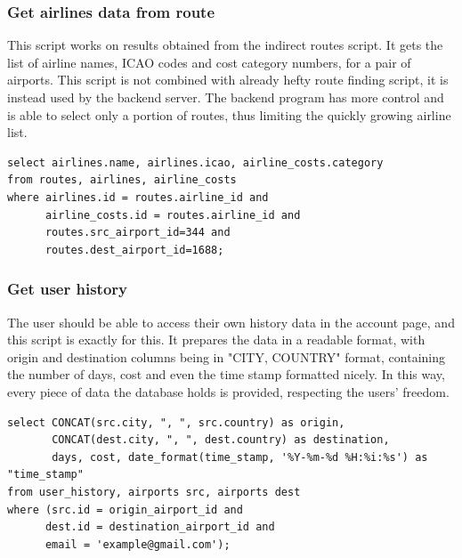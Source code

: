\documentclass[12pt]{article}
\begin{document}
\subsubsection{Get airlines data from route}
\label{sec:org02dca17}
This script works on results obtained from the indirect routes script. It gets the list of airline names, ICAO codes and cost category numbers, for a pair of airports. This script is not combined with already hefty route finding script, it is instead used by the backend server. The backend program has more control and is able to select only a portion of routes, thus limiting the quickly growing airline list.
\begin{verbatim}
select airlines.name, airlines.icao, airline_costs.category
from routes, airlines, airline_costs
where airlines.id = routes.airline_id and
	  airline_costs.id = routes.airline_id and
	  routes.src_airport_id=344 and
	  routes.dest_airport_id=1688;
\end{verbatim}

\subsubsection{Get user history}
\label{sec:org558dcc2}
The user should be able to access their own history data in the account page, and this script is exactly for this. It prepares the data in a readable format, with origin and destination columns being in "CITY, COUNTRY" format, containing the number of days, cost and even the time stamp formatted nicely. In this way, every piece of data the database holds is provided, respecting the users' freedom.
\begin{verbatim}
select CONCAT(src.city, ", ", src.country) as origin,
	   CONCAT(dest.city, ", ", dest.country) as destination,
	   days, cost, date_format(time_stamp, '%Y-%m-%d %H:%i:%s') as "time_stamp"
from user_history, airports src, airports dest
where (src.id = origin_airport_id and
	  dest.id = destination_airport_id and
	  email = 'example@gmail.com');
\end{verbatim}
\end{document}
